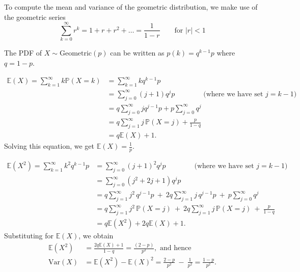 \documentclass[lecture]{csm}
\newcommand{\prob}{\mathbb{P}}
\newcommand{\expe}{\mathbb{E}}
\newcommand{\var}{\text{Var}}
\begin{document}
To compute the mean and variance of the geometric distribution, we make use of the geometric series
\[
\sum_{k=0}^\infty r^k = 1 + r + r^2 + \ldots = \frac{1}{1-r} \qquad\text{for }|r|<1
\]

\newpage

\begin{hidebox}
The PDF of $X\sim\text{Geometric}(p)$ can be written as $p(k)=q^{k-1}p$ where $q=1-p$. 

\begin{align*}
\expe(X) = \sum_{k=1}^{\infty} k \prob(X=k)
	& = \sum_{k=1}^\infty k q^{k-1} p \\
	& = \sum_{j=0}^\infty (j+1)q^j p 		\qquad \qquad\text{(where we have set $j=k-1$)} \\
	& = q\sum_{j=0}^\infty j q^{j-1} p + p\sum_{j=0}^\infty q^j \\
	& = q\sum_{j=1}^\infty j\,\prob(X=j) + \frac{p}{1-q} \\
	& = q\expe(X) + 1.
\end{align*}
Solving this equation, we get $\displaystyle \expe(X) = \frac{1}{p}$.

\newpage
\begin{align*}
\expe(X^2) = \sum_{k=1}^\infty k^2 q^{k-1}p 
	& = \sum_{j=0}^\infty (j+1)^2 q^j p \qquad \qquad\text{(where we have set $j=k-1$)} \\
	& = \sum_{j=0}^\infty (j^2+2j+1) q^j p \\
	& = q\sum_{j=1}^\infty j^2\,q^{j-1} p \ +\  2q\sum_{j=1}^\infty j\,q^{j-1} p \ +\  p\sum_{j=0}^\infty q^j \\
	& = q\sum_{j=1}^\infty j^2\,\prob(X=j) \ +\  2q\sum_{j=1}^\infty j\,\prob(X=j) \ +\  \frac{p}{1-q} \\
	& = q\expe(X^2) + 2q\expe(X) + 1.
\end{align*}
Substituting for $\expe(X)$, we obtain
\begin{align*}
\expe(X^2)	& = \frac{2q\expe(X)+1}{1-q} = \frac{(2-p)}{p^2}, \text{ and hence}\\
\var(X) 		& = \expe(X^2)-\expe(X)^2 = \frac{2-p}{p^2} \ -\  \frac{1}{p^2} = \frac{1-p}{p^2}.
\end{align*}
\vspace*{-2ex}
\end{hidebox}
\end{document}
